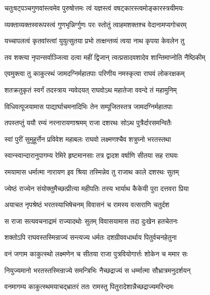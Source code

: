 \twolineshloka
{चतुःषट्पञ्चगुणवांस्त्वमेव पुरुषोत्तमः}
{त्वं यज्ञस्त्वं वषट्कारस्त्वमोङ्कारस्त्रयीमयः}%

\twolineshloka
{व्यक्ताव्यक्तस्वरूपस्त्वं गुणभृन्निर्ग्गुणः परः}
{स्तोतुं त्वाहमशक्तश्च वेदानामप्यगोचरम्}%

\twolineshloka
{यच्चापलत्वं कृतवांस्त्वां युयुत्सुतया प्रभो}
{तत्क्षन्तव्यं त्वया नाथ कृपया केवलेन तु}%

\twolineshloka
{तव शक्त्या नृपान्सर्वाञ्जित्वा दत्वा महीं द्विजान्}
{त्वत्प्रसादवशादेव शान्तिमाप्नोति नैष्ठिकीम्}%


\twolineshloka
{एवमुक्त्वा तु काकुत्स्थं जामदग्निर्महातपाः}
{परिणीय नमस्कृत्वा राघवं लोकरक्षकम्}%

\twolineshloka
{शतक्रतुकृतं स्वर्गं तदस्त्राय न्यवेदयत्}
{राघवोऽथ महातेजा ववन्दे तं महामुनिम्}%

\twolineshloka
{विधिवत्पूजयामास पाद्यार्घाचमनादिभिः}
{तेन सम्पूजितस्तत्र जामदग्निर्महातपाः}%

\twolineshloka
{तपस्तप्तुं ययौ रम्यं नरनारायणाश्रमम्}
{राजा दशरथः सोऽथ पुत्रैर्दारसमन्वितैः}%

\twolineshloka
{स्वां पुरीं सुमुहूर्त्तेन प्रविवेश महाबलः}
{राघवो लक्ष्मणश्चैव शत्रुघ्नो भरतस्तथा}%

\twolineshloka
{स्वान्स्वान्दारानुपागम्य रेमिरे हृष्टमानसाः}
{तत्र द्वादश वर्षाणि सीतया सह राघवः}%

\twolineshloka
{रमयामास धर्मात्मा नारायण इव श्रिया}
{तस्मिन्नेव तु राजाथ काले दशरथः सुतम्}%

\twolineshloka
{ज्येष्ठं राज्येन संयोक्तुमैच्छत्प्रीत्या महीपतिः}
{तस्य भार्याथ कैकेयी पुरा दत्तवरा प्रिया}%

\twolineshloka
{अयाचत नृपश्रेष्ठं भरतस्याभिषेचनम्}
{विवासनं च रामस्य वत्सराणि चतुर्दश}%

\twolineshloka
{स राजा सत्यवचनाद्रामं राज्यादथोः सुतम्}
{विवासयामास तदा दुःखेन हतचेतनः}%

\twolineshloka
{शक्तोऽपि राघवस्तस्मिन्राज्यं सन्त्यज्य धर्मतः}
{दशग्रीववधार्थाय पितुर्वचनहेतुना}%

\twolineshloka
{वनं जगाम काकुत्स्थो लक्ष्मणेन च सीतया}
{राजा पुत्रवियोगार्त्तः शोकेन च ममार सः}%

\twolineshloka
{नियुज्यमानो भरतस्तस्मिन्राज्ये समन्त्रिभिः}
{नैच्छद्राज्यं स धर्म्मात्मा सौभ्रात्रमनुदर्शयन्}%

\twolineshloka
{वनमागम्य काकुत्स्थमयाचद्भ्रातरं ततः}
{रामस्तु पितुरादेशान्नैच्छद्राज्यमरिन्दमः}%

